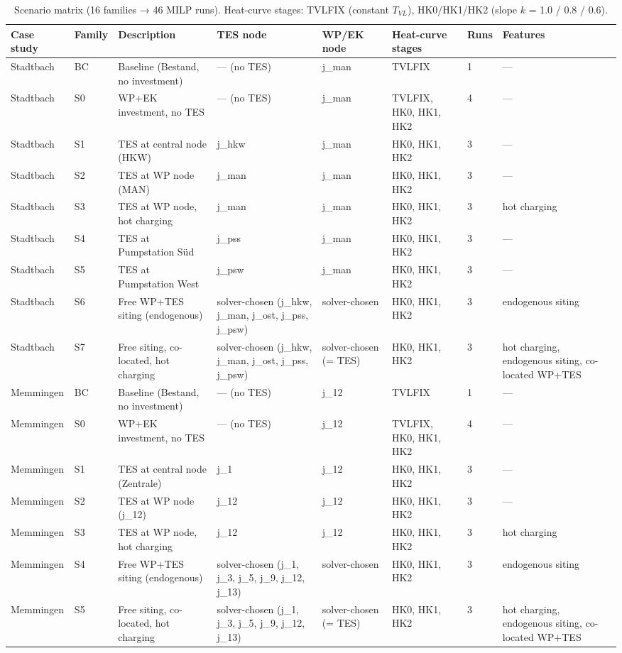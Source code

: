 \begin{table}[htbp]
  \centering
  \caption{Scenario matrix (16 families → 46 MILP runs). Heat-curve stages: TVLFIX (constant $T_{VL}$), HK0/HK1/HK2 (slope $k$ = 1.0 / 0.8 / 0.6).}
  \label{tab:t2_scenarios}
  \begin{tabular}{llllllll}
  \toprule
  Case study & Family & Description & TES node & WP/EK node & Heat-curve stages & Runs & Features \\
  \midrule
  Stadtbach & BC & Baseline (Bestand, no investment) & — (no TES) & j\_man & TVLFIX & 1 & — \\
  Stadtbach & S0 & WP+EK investment, no TES & — (no TES) & j\_man & TVLFIX, HK0, HK1, HK2 & 4 & — \\
  Stadtbach & S1 & TES at central node (HKW) & j\_hkw & j\_man & HK0, HK1, HK2 & 3 & — \\
  Stadtbach & S2 & TES at WP node (MAN) & j\_man & j\_man & HK0, HK1, HK2 & 3 & — \\
  Stadtbach & S3 & TES at WP node, hot charging & j\_man & j\_man & HK0, HK1, HK2 & 3 & hot charging \\
  Stadtbach & S4 & TES at Pumpstation Süd & j\_pss & j\_man & HK0, HK1, HK2 & 3 & — \\
  Stadtbach & S5 & TES at Pumpstation West & j\_psw & j\_man & HK0, HK1, HK2 & 3 & — \\
  Stadtbach & S6 & Free WP+TES siting (endogenous) & solver-chosen (j\_hkw, j\_man, j\_ost, j\_pss, j\_psw) & solver-chosen & HK0, HK1, HK2 & 3 & endogenous siting \\
  Stadtbach & S7 & Free siting, co-located, hot charging & solver-chosen (j\_hkw, j\_man, j\_ost, j\_pss, j\_psw) & solver-chosen (= TES) & HK0, HK1, HK2 & 3 & hot charging, endogenous siting, co-located WP+TES \\
  Memmingen & BC & Baseline (Bestand, no investment) & — (no TES) & j\_12 & TVLFIX & 1 & — \\
  Memmingen & S0 & WP+EK investment, no TES & — (no TES) & j\_12 & TVLFIX, HK0, HK1, HK2 & 4 & — \\
  Memmingen & S1 & TES at central node (Zentrale) & j\_1 & j\_12 & HK0, HK1, HK2 & 3 & — \\
  Memmingen & S2 & TES at WP node (j\_12) & j\_12 & j\_12 & HK0, HK1, HK2 & 3 & — \\
  Memmingen & S3 & TES at WP node, hot charging & j\_12 & j\_12 & HK0, HK1, HK2 & 3 & hot charging \\
  Memmingen & S4 & Free WP+TES siting (endogenous) & solver-chosen (j\_1, j\_3, j\_5, j\_9, j\_12, j\_13) & solver-chosen & HK0, HK1, HK2 & 3 & endogenous siting \\
  Memmingen & S5 & Free siting, co-located, hot charging & solver-chosen (j\_1, j\_3, j\_5, j\_9, j\_12, j\_13) & solver-chosen (= TES) & HK0, HK1, HK2 & 3 & hot charging, endogenous siting, co-located WP+TES \\
  \bottomrule
  \end{tabular}
\end{table}

